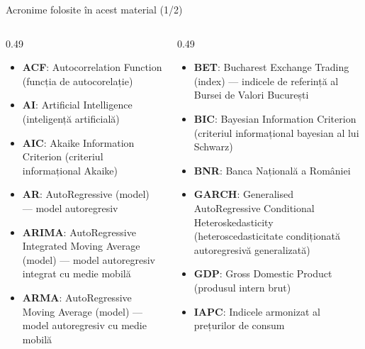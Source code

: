\begin{frame}{Acronime folosite în acest material (1/2)}
\begin{columns}[T]
\begin{column}{0.49\textwidth}
\begin{itemize}\setlength{\itemsep}{0pt}
    \item \textbf{ACF}: Autocorrelation Function (funcția de autocorelație)
    \item \textbf{AI}: Artificial Intelligence (inteligență artificială)
    \item \textbf{AIC}: Akaike Information Criterion (criteriul informațional Akaike)
    \item \textbf{AR}: AutoRegressive (model) — model autoregresiv
    \item \textbf{ARIMA}: AutoRegressive Integrated Moving Average (model) — model autoregresiv integrat cu medie mobilă
    \item \textbf{ARMA}: AutoRegressive Moving Average (model) — model autoregresiv cu medie mobilă
\end{itemize}
\end{column}
\begin{column}{0.49\textwidth}
\begin{itemize}\setlength{\itemsep}{0pt}
    \item \textbf{BET}: Bucharest Exchange Trading (index) — indicele de referință al Bursei de Valori București
    \item \textbf{BIC}: Bayesian Information Criterion (criteriul informațional bayesian al lui Schwarz)
    \item \textbf{BNR}: Banca Națională a României
    \item \textbf{GARCH}: Generalised AutoRegressive Conditional Heteroskedasticity (heteroscedasticitate condiționată autoregresivă generalizată)
    \item \textbf{GDP}: Gross Domestic Product (produsul intern brut)
    \item \textbf{IAPC}: Indicele armonizat al prețurilor de consum
\end{itemize}
\end{column}
\end{columns}
\end{frame}
